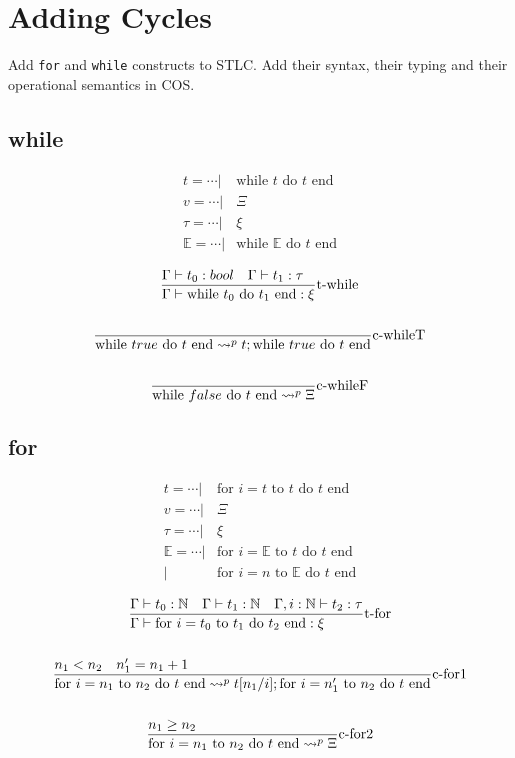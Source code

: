 \documentclass{article}
\newcommand{\st}[3][]{\ensuremath{\displaystyle\frac{#3\hfill}{#2\hfill} \text{#1}}}
\newcommand{\N}{\ensuremath \mathbb N}
\newcommand{\while}[2]{\ensuremath{\text{while }#1\text{ do }#2\text{ end}}}
\newcommand{\for}[3]{\ensuremath{\text{for }i=#1\text{ to }#2\text{ do }#3\text{ end}}}
\newcommand{\mE}[0]{\ensuremath{\mathbb{E}}}
\begin{document}
\section{Adding Cycles}
Add \texttt{for} and \texttt{while} constructs to STLC. Add their syntax, their typing and their operational
semantics in COS.

\subsection{while}
\begin{align*}
    t = \cdots |& \while{t}{t} \\
    v = \cdots |& \Xi \\
    \tau = \cdots |& \xi \\
    \mE = \cdots |& \while{\mE}{t} \\
\end{align*}
\begin{gather*}
    \st[t-while]{\Gamma\vdash \while{t_0}{t_1}: \xi }{\Gamma\vdash t_0:bool \quad \Gamma\vdash t_1:\tau} \\
    \\
    \st[c-whileT]{\while{true}{t} \leadsto^p t;\while{true}{t} }{} \\
    \\
    \st[c-whileF]{\while{false}{t} \leadsto^p \Xi }{}
\end{gather*}

\subsection{for}
\begin{align*}
    t = \cdots |& \for{t}{t}{t} \\
    v = \cdots |& \Xi \\
    \tau = \cdots |& \xi \\
    \mE = \cdots  |& \for{\mE}{t}{t} \\
                  |& \for{n}{\mE}{t} \\
\end{align*}
\begin{gather*}
    \st[t-for]{\Gamma\vdash \for{t_0}{t_1}{t_2}: \xi }{\Gamma\vdash t_0:\N \quad \Gamma\vdash t_1:\N \quad \Gamma,i:\N\vdash t_2:\tau} \\
    \\
    \st[c-for1]{
        \for{n_1}{n_2}{t} \leadsto^p t[n_1/i];\for{n_1'}{n_2}{t}
    }{
        n_1<n_2
        \quad
        n_1' = n_1+1
    } \\
    \\
    \st[c-for2]{
        \for{n_1}{n_2}{t} \leadsto^p \Xi
    }{
        n_1\geq n_2
    } \\
\end{gather*}
\end{document}
